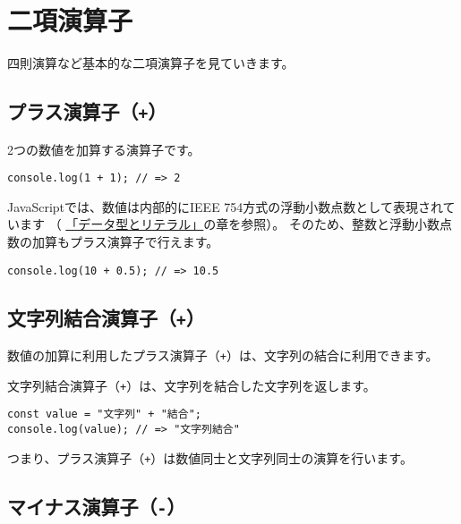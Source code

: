 \hypertarget{binary-operator}{%
\section{二項演算子}\label{binary-operator}}

四則演算など基本的な二項演算子を見ていきます。

\hypertarget{plus-operator}{%
\subsection{\texorpdfstring{プラス演算子（\texttt{+}）}{プラス演算子（+）}}\label{plus-operator}}

2つの数値を加算する演算子です。

\begin{lstlisting}
console.log(1 + 1); // => 2
\end{lstlisting}

JavaScriptでは、数値は内部的にIEEE
754方式の浮動小数点数として表現されています （
\hyperlink{data-type-and-literal}{「データ型とリテラル」}の章を参照）。
そのため、整数と浮動小数点数の加算もプラス演算子で行えます。

\begin{lstlisting}
console.log(10 + 0.5); // => 10.5
\end{lstlisting}

\hypertarget{string-combination-operator}{%
\subsection{\texorpdfstring{文字列結合演算子（\texttt{+}）}{文字列結合演算子（+）}}\label{string-combination-operator}}

数値の加算に利用したプラス演算子（\texttt{+}）は、文字列の結合に利用できます。

文字列結合演算子（\texttt{+}）は、文字列を結合した文字列を返します。

\begin{lstlisting}
const value = "文字列" + "結合";
console.log(value); // => "文字列結合"
\end{lstlisting}

つまり、プラス演算子（\texttt{+}）は数値同士と文字列同士の演算を行います。

\hypertarget{minus-operator}{%
\subsection{\texorpdfstring{マイナス演算子（\texttt{-}）}{マイナス演算子（-）}}\label{minus-operator}}

